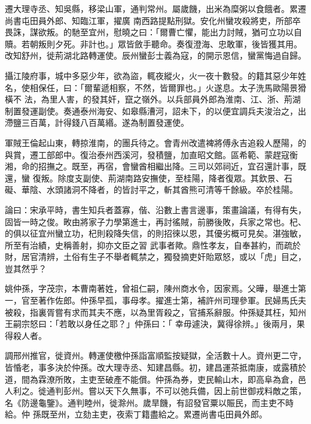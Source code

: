 \begin{pinyinscope}
 遷大理寺丞、知吳縣，移梁山軍，通判常州。屬歲饑，出米為糜粥以食餓者。累遷尚書屯田員外郎、知臨江軍，擢廣
 南西路提點刑獄。安化州蠻攻殺將吏，所部卒畏誅，謀欲叛。的馳至宜州，慰曉之曰：「爾曹亡懼，能出力討賊，猶可立功以自贖。若朝叛則夕死。非計也。」眾皆斂手聽命。奏復澄海、忠敢軍，後皆獲其用。改知舒州，徙荊湖北路轉運使。辰州蠻彭士義為寇，的開示恩信，蠻黨悔過自歸。



 攝江陵府事，城中多惡少年，欲為盜，輒夜縱火，火一夜十數發。的籍其惡少年姓名，使相保任，曰：「爾輩遞相察，不然，皆爾罪也。」火遂息。太子洗馬歐陽景猾橫不
 法，為里人害，的發其奸，竄之嶺外。以兵部員外郎為淮南、江、浙、荊湖制置發運副使。奏通泰州海安、如皋縣漕河，詔未下，的以便宜調兵夫浚治之，出滯鹽三百萬，計得錢八百萬緡。遂為制置發運使。



 軍賊王倫起山東，轉掠淮南，的團兵待之。會青州改遣裨將傅永吉追殺人歷陽，的與賞，遷工部郎中。復治泰州西溪河，發積鹽，加直昭文館。區希範、蒙趕寇衡湘，命的招撫之。既至，再宿，會蠻酋相繼出降。三司以郊祠近，宜召還計事，既還，蠻
 復叛。除度支副使、荊湖南路安撫使，至桂陽，降者復眾。其欽景、石礙、華陰、水頭諸洞不降者，的皆討平之，斬其酋熊可清等千餘級。卒於桂陽。



 論曰：宋承平時，書生知兵者蓋寡，偕、沿數上書言邊事，策畫論議，有得有失，固皆一時之俊。畋由將家子力學第進士，再討徭賊，前勝後敗，兵家之常也。杞、的俱以征宜州蠻立功，杞則殺降失信，的則招徠以恩，其優劣概可見矣。湛強敏，所至有治績，史稱善射，抑亦文臣之習
 武事者歟。鼎性孝友，自奉甚約，而疏於財，居官清辨，土俗有生子不舉者輒禁之，獨發摘吏奸貽眾怒，或以「虎」目之，豈其然乎？



 姚仲孫，字茂宗，本曹南著姓，曾祖仁嗣，陳州商水令，因家焉。父曄，舉進士第一，官至著作佐郎。仲孫早孤，事母孝。擢進士第，補許州司理參軍。民婦馬氏夫被殺，指裏胥嘗有求而其夫不應，以為里胥殺之，官捕系辭服。仲孫疑其枉，知州王嗣宗怒曰：「若敢以身任之耶？」仲孫曰：「
 幸毋遽決，冀得徐辨。」後兩月，果得殺人者。



 調邢州推官，徙資州。轉運使檄仲孫詣富順監按疑獄，全活數十人。資州更二守，皆惛老，事多決於仲孫。改大理寺丞、知建昌縣。初，建昌運茶抵南康，或露積於道，間為霖潦所敗，主吏至破產不能償。仲孫為券，吏民輸山木，即高阜為倉，邑人利之。徙通判彭州。嘗以天下久無事，不可以弛兵備，因上前世御戎料敵之策，名《防邊龜鑒》。通判睦州，徙滁州。歲旱饑，有詔發官粟以賑民，而主吏不時給。仲
 孫既至州，立劾主吏，夜索丁籍盡給之。累遷尚書屯田員外郎。




\end{pinyinscope}

